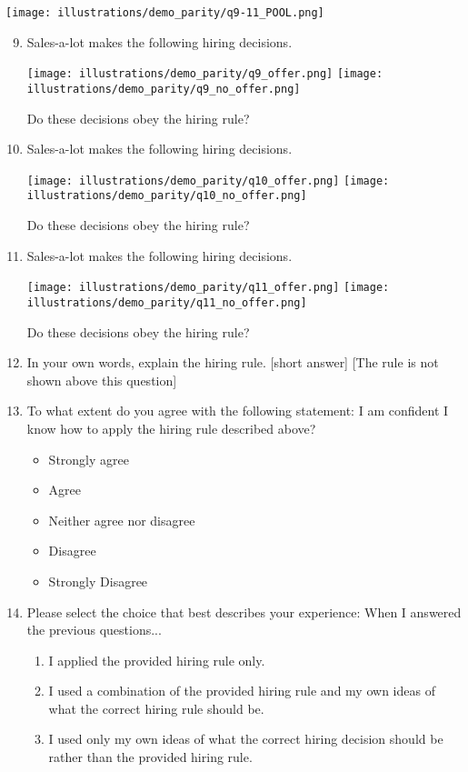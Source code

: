 \documentclass{article}
\newcommand{\correct}[1]{{\color{red}{#1}}}
\newcommand{\correct}[1]{{\color{red}{#1}}}
\begin{document}
\texttt{[image: illustrations/demo\_parity/q9-11\_POOL.png]}
\begin{enumerate}
\setcounter{enumi}{8}
    \item Sales-a-lot makes the following hiring decisions.

    \texttt{[image: illustrations/demo\_parity/q9\_offer.png]}
    \space\space\space
    \texttt{[image: illustrations/demo\_parity/q9\_no\_offer.png]}
    
    Do these decisions obey the hiring rule? \correct{Yes}

\item Sales-a-lot makes the following hiring decisions.

    \texttt{[image: illustrations/demo\_parity/q10\_offer.png]}
    \space\space\space
    \texttt{[image: illustrations/demo\_parity/q10\_no\_offer.png]}
    
    Do these decisions obey the hiring rule? \correct{No}
    
\item Sales-a-lot makes the following hiring decisions.

    \texttt{[image: illustrations/demo\_parity/q11\_offer.png]}
    \space\space\space
    \texttt{[image: illustrations/demo\_parity/q11\_no\_offer.png]}
    
    Do these decisions obey the hiring rule? \correct{No}

\item In your own words, explain the hiring rule. [short answer] [The rule is not shown above this question]

\item To what extent do you agree with the following statement: I am confident I know how to apply the hiring rule described above?
\begin{itemize}
    \item Strongly agree
    \item Agree
    \item Neither agree nor disagree
    \item Disagree
    \item Strongly Disagree
\end{itemize}

\item Please select the choice that best describes your experience: When I answered the previous questions...
\begin{enumerate}
    \item I applied the provided hiring rule only.
    \item I used a combination of the provided hiring rule and my own ideas of what the correct hiring rule should be.
    \item I used only my own ideas of what the correct hiring decision should be rather than the provided hiring rule.
\end{enumerate}


\end{enumerate}
\end{document}
